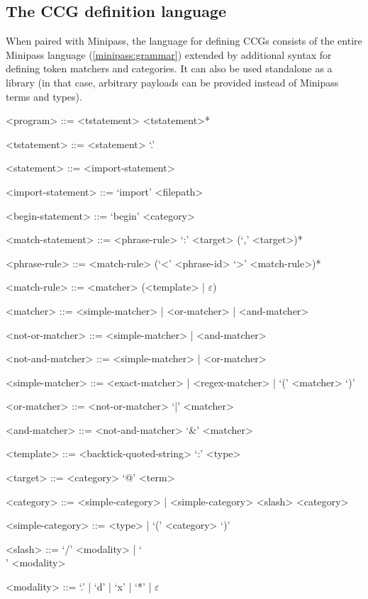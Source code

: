 \documentclass[main.tex]{subfiles}
\begin{document}
\pagebreak
\subsection{The CCG definition language}
When paired with Minipass, the language for defining CCGs consists of
the entire Minipass language
(\cref{minipass:grammar}) extended by additional syntax for defining
token matchers and categories. It can also be used standalone as a library
(in that case, arbitrary payloads can be provided instead of Minipass
terms and types).

\begin{grammar}
    <program> ::= <tstatement> <tstatement>*

    <tstatement> ::= <statement> `.'

    <statement>  ::= <import-statement>

    <import-statement> ::= `import' <filepath>

    <begin-statement>  ::= `begin' <category>

    <match-statement>  ::= <phrase-rule> `:' <target> (`,' <target>)*

    <phrase-rule> ::= <match-rule> (`<' <phrase-id> `>' <match-rule>)*

    <match-rule> ::= <matcher> (<template> | $\varepsilon$)

    <matcher> ::= <simple-matcher> | <or-matcher> | <and-matcher>

    <not-or-matcher> ::= <simple-matcher> | <and-matcher>

    <not-and-matcher> ::= <simple-matcher> | <or-matcher>

    <simple-matcher> ::= <exact-matcher> | <regex-matcher> | `(' <matcher> `)'

    <or-matcher> ::= <not-or-matcher> `|' <matcher>

    <and-matcher> ::= <not-and-matcher> `\&' <matcher>

    <template> ::= <backtick-quoted-string> `:' <type>

    <target> ::= <category> `@' <term>

    <category> ::= <simple-category> | <simple-category> <slash> <category>

    <simple-category> ::= <type> | `(' <category> `)'

    <slash> ::= `/' <modality> | `\\' <modality>

    <modality> ::= `.' | `d' | `x' | `*' | $\varepsilon$
\end{grammar}
\end{document}
